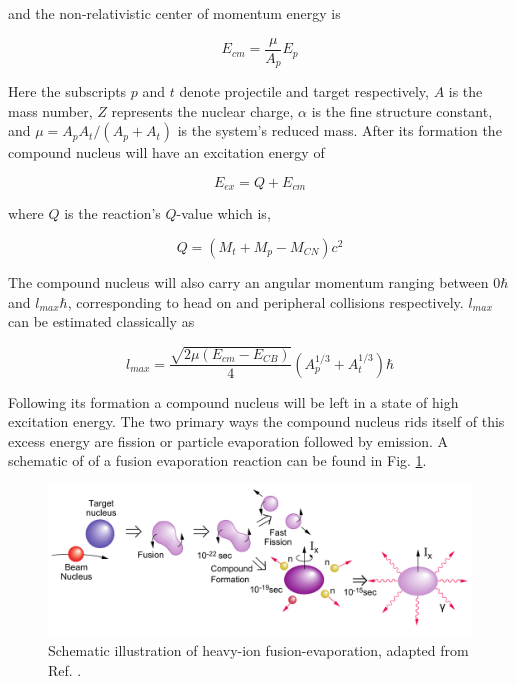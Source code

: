 and the non-relativistic center of momentum energy is

\begin{equation}
\label{eqn:cmf_en}
E_{cm} = \frac{\mu}{A_{p}}E_{p}
\end{equation}

Here the subscripts $p$ and $t$ denote projectile and target respectively, $A$ is the mass number, $Z$ represents the nuclear charge, $\alpha{}$ is the fine structure constant, and $\mu = A_{p}A_{t}/(A_{p}+A_{t})$ is the system's reduced mass. After its formation the compound nucleus will have an excitation energy of

\begin{equation}
\label{eqn:cn_ex}
E_{ex} = Q + E_{cm}
\end{equation}

where $Q$ is the reaction's $Q$-value which is,

\begin{equation}
\label{eqn:cn_form_qvalue}
Q = (M_t+M_p-M_{CN})c^2
\end{equation}

The compound nucleus will also carry an angular momentum ranging between $0 \hbar$ and $l_{max} \hbar$, corresponding to head on and peripheral collisions respectively. $l_{max}$ can be estimated classically as

\begin{equation}
\label{eqn:cn_lmax}
l_{max} = \frac{\sqrt{2\mu(E_{cm}-E_{CB})}}{4}(A^{1/3}_p + A^{1/3}_t)\hbar
\end{equation}

Following its formation a compound nucleus will be left in a state of high excitation energy. The two primary ways the compound nucleus rids itself of this excess energy are fission\cite{fastFission} or particle evaporation followed by \gr{} emission. A schematic of of a fusion evaporation reaction can be found in Fig. \ref{fig:chp3-fus-evap-schem}.

\begin{figure}[h!]
	\centerline{\includegraphics[width=\textwidth]{./img/c3/fusion_evaporation.pdf}}
	\caption{Schematic illustration of heavy-ion fusion-evaporation, adapted from Ref. \cite{gsBooklet}.}
	\label{fig:chp3-fus-evap-schem}
\end{figure}

